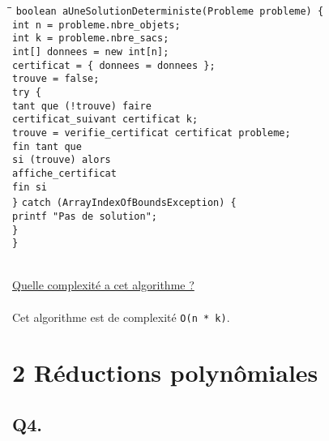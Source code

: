 \begin{tabbing}
	\hspace{1cm}\=\hspace{1cm}\=\hspace{1cm}\=\kill
	\verb+boolean aUneSolutionDeterministe(Probleme probleme) {+\\
		\>\verb+int n = probleme.nbre_objets;+\\
		\>\verb+int k = probleme.nbre_sacs;+\\
		\>\verb+int[] donnees = new int[n];+\\
		\>\verb+certificat = { donnees = donnees };+\\
		\>\verb+trouve = false;+\\
		\>\verb+try {+\\
			\>\>\verb+tant que (!trouve) faire+\\
				\>\>\>\verb+certificat_suivant certificat k;+\\
				\>\>\>\verb+trouve = verifie_certificat certificat probleme;+\\
			\>\>\verb+fin tant que+\\
			\>\>\verb+si (trouve) alors+\\
				\>\>\>\verb+affiche_certificat+\\
			\>\>\verb+fin si+\\
		\>\verb+}+
		\>\verb+catch (ArrayIndexOfBoundsException) {+\\
			\>\>\verb+printf "Pas de solution";+\\
		\>\verb+}+\\
	\verb+}+

\end{tabbing}
~\\
\underline{Quelle complexité a cet algorithme ?}
~\\~\\
Cet algorithme est de complexité \verb+O(n * k)+.

\section*{2 Réductions polynômiales}

\subsection*{Q4.}

